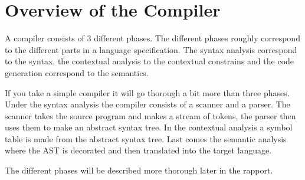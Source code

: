 \section{Overview of the Compiler}


A compiler consists of 3 different phases. The different phases roughly correspond to the different parts in a language specification. The syntax analysis correspond to the syntax, the contextual analysis to the contextual constrains and the code generation correspond to the semantics.


If you take a simple compiler it will go thorough a bit more than three phases. Under the syntax analysis the compiler consists of a scanner and a parser. The scanner takes the source program and makes a stream of tokens, the parser then uses them to make an abstract syntax tree. In the contextual analysis a symbol table is made from the abstract syntax tree. Last comes the semantic analysis where the AST is decorated and then translated into the target language.

The different phases will be described more thorough later in the rapport. 
